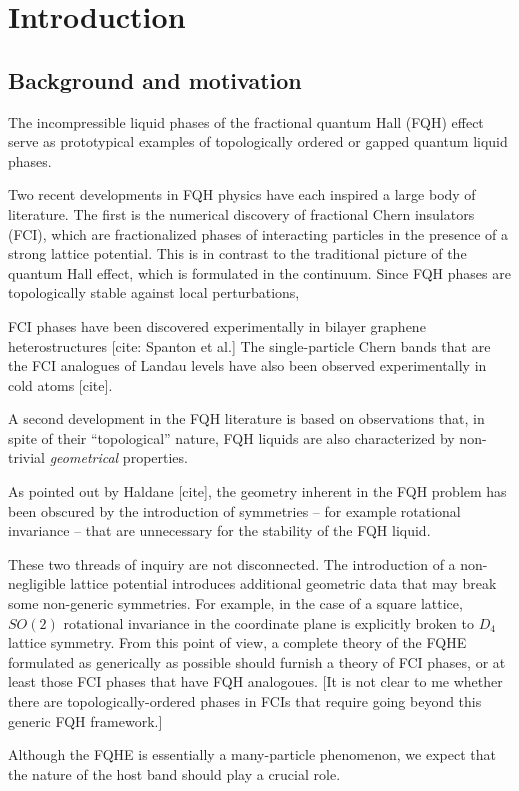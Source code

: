 \documentclass[aps,prb,twocolumn,letterpaper,twoside,nobalancelastpage,groupedaddress,amsmath,amssymb,floatfix,citeautoscript]{revtex4-1}
\begin{document}
\section{Introduction}
\subsection{Background and motivation}
The incompressible liquid phases of the fractional quantum Hall (FQH) effect serve as prototypical examples of topologically ordered or gapped quantum liquid phases.

Two recent developments in FQH physics have each inspired a large body of literature. The first is the numerical discovery of fractional Chern insulators (FCI), which are fractionalized phases of interacting particles in the presence of a strong lattice potential. This is in contrast to the traditional picture of the quantum Hall effect, which is formulated in the continuum. Since FQH phases are topologically stable against local perturbations,

FCI phases have been discovered experimentally in bilayer graphene heterostructures [cite: Spanton et al.] The single-particle Chern bands that are the FCI analogues of Landau levels have also been observed experimentally in cold atoms [cite].

A second development in the FQH literature is based on observations that, in spite of their ``topological'' nature, FQH liquids are also characterized by non-trivial \textit{geometrical} properties.

As pointed out by Haldane [cite], the geometry inherent in the FQH problem has been obscured by the introduction of symmetries -- for example rotational invariance -- that are unnecessary for the stability of the FQH liquid. 

These two threads of inquiry are not disconnected. The introduction of a non-negligible lattice potential introduces additional geometric data that may break some non-generic symmetries. For example, in the case of a square lattice, $SO(2)$ rotational invariance in the coordinate plane is explicitly broken to $D_4$ lattice symmetry. From this point of view, a complete theory of the FQHE formulated as generically as possible should furnish a theory of FCI phases, or at least those FCI phases that have FQH analogoues. [It is not clear to me whether there are topologically-ordered phases in FCIs that require going beyond this generic FQH framework.]


Although the FQHE is essentially a many-particle phenomenon, we expect that the nature of the host band should play a crucial role. 
\end{document}
